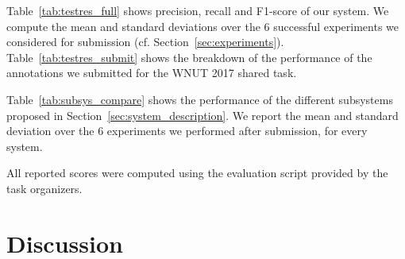 \documentclass[11pt,letterpaper]{article}
\begin{document}
\begin{table*}[ht]
\centering
{}
\caption{Performance of the different subsystems evaluated on the test set, after the submission}\label{tab:subsys_compare}
\end{table*}

Table~\ref{tab:testres_full} shows precision, recall and F1-score of our system.
We compute the mean and standard deviations over the $6$ successful experiments
we considered for submission (cf. Section~\ref{sec:experiments}). Table~\ref{tab:testres_submit}
shows the breakdown of the performance of the annotations we submitted for the
WNUT 2017 shared task.

Table~\ref{tab:subsys_compare} shows the performance of the different subsystems
proposed in Section~\ref{sec:system_description}. We report the mean and standard
deviation over the $6$ experiments we performed after submission, for every system.

All reported scores were computed using the evaluation
script provided by the task organizers.

\section{Discussion}
\end{document}
